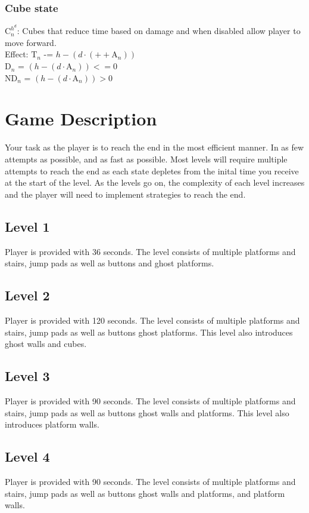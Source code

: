 \documentclass[10pt]{article}
\begin{document}
\subsubsection*{Cube state}
$\text{C}_{n}^{h^{d}}$: Cubes that reduce time based on damage and when disabled allow player to move forward. \\
Effect: $\text{T}_{n}$ -= $h - (d \cdot (++\text{A}_{n}))$ \\
$\text{D}_{n}$ = $(h - (d \cdot \text{A}_{n})) <= 0$ \\
$\text{ND}_{n}$ = $(h - (d \cdot \text{A}_{n})) > 0$

\section*{Game Description}
Your task as the player is to reach the end in the most efficient manner. In as few attempts as possible, and as fast as possible. Most levels will require multiple attempts to reach the end as each state depletes from the inital time you receive at the start of the level. As the levels go on, the complexity of each level increases and the player will need to implement strategies to reach the end.

\subsection*{Level 1}
Player is provided with 36 seconds. The level consists of multiple platforms and stairs, jump pads as well as buttons and ghost platforms. 

\subsection*{Level 2}
Player is provided with 120 seconds. The level consists of multiple platforms and stairs, jump pads as well as buttons ghost platforms. This level also introduces ghost walls and cubes.

\subsection*{Level 3}
Player is provided with 90 seconds. The level consists of multiple platforms and stairs, jump pads as well as buttons ghost walls and platforms. This level also introduces platform walls.

\subsection*{Level 4}
Player is provided with 90 seconds. The level consists of multiple platforms and stairs, jump pads as well as buttons ghost walls and platforms, and platform walls.
\end{document}

